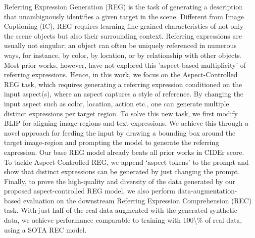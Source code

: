 Referring Expression Generation (REG) is the task of generating a description that unambiguously identifies a given target in the scene. Different from Image Captioning (IC), REG requires learning fine-grained characteristics of not only the scene objects but also their surrounding context. Referring expressions are usually not singular; an object can often be uniquely referenced in numerous ways, for instance, by color, by location, or by relationship with other objects. Most prior works, however, have not explored this 'aspect-based multiplicity' of referring expressions. Hence, in this work, we focus on the Aspect-Controlled REG task, which requires generating a referring expression conditioned on the input aspect(s), where an aspect captures a style of reference. By changing the input aspect such as color, location, action etc., one can generate multiple distinct expressions per target region. To solve this new task, we first modify BLIP for aligning image-regions and text-expressions. We achieve this through a novel approach for feeding the input by drawing a bounding box around the target image-region and prompting the model to generate the referring expression. Our base REG model already beats all prior works in CIDEr score. To tackle Aspect-Controlled REG, we append `aspect tokens' to the prompt and show that distinct expressions can be generated by just changing the prompt. Finally, to prove the high-quality and diversity of the data generated by our proposed aspect-controlled REG model, we also perform data-augmentation-based evaluation on the downstream Referring Expression Comprehension (REC) task. With just half of the real data augmented with the generated synthetic data, we achieve performance comparable to training with 100\textbackslash{}\% of real data, using a SOTA REC model.